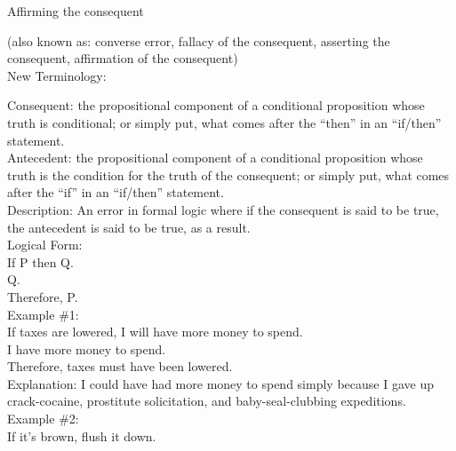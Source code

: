 \documentclass[a4paper,12pt,single,pdftex]{scrartcl}
\begin{document}
  

Affirming the consequent
    
      (also known as: converse error, fallacy of the consequent, asserting the consequent, affirmation of the consequent)
    \\

  
    New Terminology:

    
      Consequent: the propositional component of a conditional proposition whose truth is conditional; or simply put, what comes after the “then” in an “if/then” statement.
    \\

    
      Antecedent: the propositional component of a conditional proposition whose truth is the condition for the truth of the consequent; or simply put, what comes after the “if” in an “if/then” statement.
    \\

    
      Description: An error in formal logic where if the consequent is said to be true, the antecedent is said to be true, as a result.
    \\

    
      Logical Form:
    \\

    
      If P then Q.
    \\

    
      Q.
    \\

    
      Therefore, P.
    \\

    
      Example \#1:
    \\

    
      If taxes are lowered, I will have more money to spend.
    \\

    
      I have more money to spend.
    \\

    
      Therefore, taxes must have been lowered.
    \\

    
      Explanation: I could have had more money to spend simply because I gave up crack-cocaine, prostitute solicitation, and baby-seal-clubbing expeditions.
    \\

    
      Example \#2:
    \\

    
      If it’s brown, flush it down.
    \\
\end{document}
